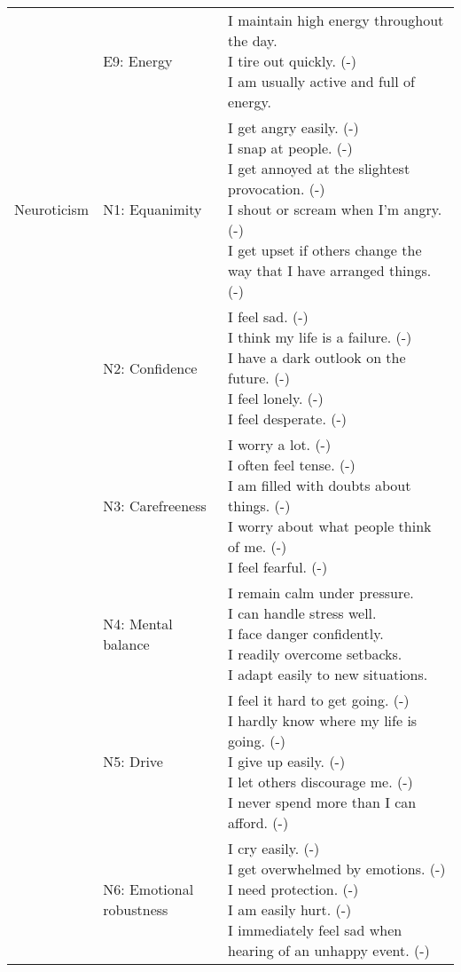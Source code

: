\begin{appendix}
\begin{longtable}[t]{lll}
\addlinespace
 & E9: Energy & \makecell[l]{I maintain high energy throughout the day.\\I tire out quickly. (-)\\I am usually active and full of energy.}\\
\addlinespace
Neuroticism & N1: Equanimity & \makecell[l]{I get angry easily. (-)\\I snap at people. (-)\\I get annoyed at the slightest provocation. (-)\\I shout or scream when I'm angry. (-)\\I get upset if others change the way that I have arranged things. (-)}\\
\addlinespace
 & N2: Confidence & \makecell[l]{I feel sad. (-)\\I think my life is a failure. (-)\\I have a dark outlook on the future. (-)\\I feel lonely. (-)\\I feel desperate. (-)}\\
\addlinespace
 & N3: Carefreeness & \makecell[l]{I worry a lot. (-)\\I often feel tense. (-)\\I am filled with doubts about things. (-)\\I worry about what people think of me. (-)\\I feel fearful. (-)}\\
\addlinespace
 & N4: Mental balance & \makecell[l]{I remain calm under pressure.\\I can handle stress well.\\I face danger confidently.\\I readily overcome setbacks.\\I adapt easily to new situations.}\\
\addlinespace
 & N5: Drive & \makecell[l]{I feel it hard to get going. (-)\\I hardly know where my life is going. (-)\\I give up easily. (-)\\I let others discourage me. (-)\\I never spend more than I can afford. (-)}\\
\addlinespace
 & N6: Emotional robustness & \makecell[l]{I cry easily. (-)\\I get overwhelmed by emotions. (-)\\I need protection. (-)\\I am easily hurt. (-)\\I immediately feel sad when hearing of an unhappy event. (-)}\\

\end{longtable}
\end{appendix}
